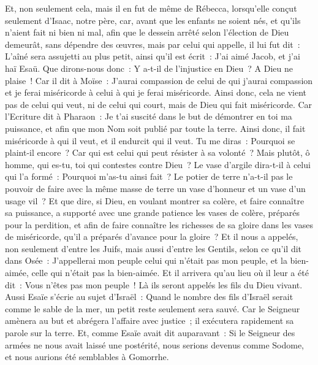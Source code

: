 \begin{multicols}{2}
Et, non seulement cela, mais il en fut de même de Rébecca, lorsqu'elle conçut seulement d'Isaac, notre père,
car, avant que les enfants ne soient nés, et qu'ils n'aient fait ni bien ni mal, afin que le dessein arrêté selon l'élection de Dieu demeurât, sans dépendre des œuvres, mais par celui qui appelle,
il lui fut dit~: L'aîné sera assujetti au plus petit, ainsi qu'il est écrit~:
J'ai aimé Jacob, et j'ai haï Esaü.
Que dirons-nous donc~: Y a-t-il de l'injustice en Dieu~? A Dieu ne plaise~!
Car il dit à Moïse~: J'aurai compassion de celui de qui j'aurai compassion et je ferai miséricorde à celui à qui je ferai miséricorde.
Ainsi donc, cela ne vient pas de celui qui veut, ni de celui qui court, mais de Dieu qui fait miséricorde.
Car l'Ecriture dit à Pharaon~: Je t'ai suscité dans le but de démontrer en toi ma puissance, et afin que mon Nom soit publié par toute la terre.
Ainsi donc, il fait miséricorde à qui il veut, et il endurcit qui il veut.
Tu me diras~: Pourquoi se plaint-il encore~? Car qui est celui qui peut résister à sa volonté~?
Mais plutôt, ô homme, qui es-tu, toi qui contestes contre Dieu~? Le vase d'argile dira-t-il à celui qui l'a formé~: Pourquoi m'as-tu ainsi fait~?
Le potier de terre n'a-t-il pas le pouvoir de faire avec la même masse de terre un vase d'honneur et un vase d'un usage vil~?
Et que dire, si Dieu, en voulant montrer sa colère, et faire connaître sa puissance, a supporté avec une grande patience les vases de colère, préparés pour la perdition,
et afin de faire connaître les richesses de sa gloire dans les vases de miséricorde, qu'il a préparés d'avance pour la gloire~?
Et il nous a appelés, non seulement d'entre les Juifs, mais aussi d'entre les Gentils,
selon ce qu'il dit dans Osée~: J'appellerai mon peuple celui qui n'était pas mon peuple, et la bien-aimée, celle qui n'était pas la bien-aimée.
Et il arrivera qu'au lieu où il leur a été dit~: Vous n'êtes pas mon peuple~! Là ils seront appelés les fils du Dieu vivant.
Aussi Esaïe s'écrie au sujet d'Israël~: Quand le nombre des fils d'Israël serait comme le sable de la mer, un petit reste seulement sera sauvé.
Car le Seigneur amènera au but et abrégera l'affaire avec justice~; il exécutera rapidement sa parole sur la terre.
Et, comme Esaïe avait dit auparavant~: Si le Seigneur des armées ne nous avait laissé une postérité, nous serions devenus comme Sodome, et nous aurions été semblables à Gomorrhe.

\end{multicols}
